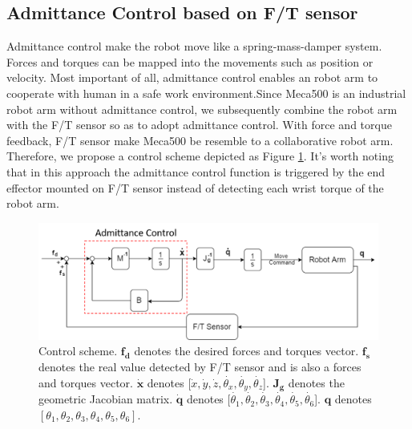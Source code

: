 \subsection{Admittance Control based on F/T sensor}
Admittance control make the robot move like a spring-mass-damper system. Forces and torques can be mapped into the movements such as position or velocity. Most important of all, admittance control enables an robot arm to cooperate with human in a safe work environment.Since Meca500 is an industrial robot arm without admittance control, we subsequently combine the robot arm with the F/T sensor so as to adopt admittance control. With force and torque feedback, F/T sensor make Meca500 be resemble to a collaborative robot arm. Therefore, we propose a control scheme depicted as Figure \ref{fig:adm ctrl}. It's worth noting that in this approach the admittance control function is triggered by the end effector mounted on F/T sensor instead of detecting each wrist torque of the robot arm.

\label{sec:adm ctrl}
\begin{figure}[htbp]
\begin{center}
\includegraphics[width=1\linewidth]{Images/adm ctrl.png}
\end{center}
\caption{
Control scheme. $\boldsymbol{f_d}$ denotes the desired forces and torques vector. $\boldsymbol{f_s}$ denotes the real value detected by F/T sensor and is also a forces and torques vector. $\boldsymbol{\dot{x}}$ denotes [$\dot{x}, \dot{y}, \dot{z}, \dot{\theta _x}, \dot{\theta _y}, \dot{\theta _z}$]. $\mathbf{J_g}$ denotes the geometric Jacobian matrix. $\boldsymbol{\dot{q}}$ denotes [$\dot{\theta _1}, \dot{\theta _2}, \dot{\theta _3}, \dot{\theta _4}, \dot{\theta _5}, \dot{\theta _6}$]. $\boldsymbol{q}$ denotes $\left[\theta _1, \theta _2, \theta _3, \theta _4, \theta _5, \theta _6 \right] $.
}\label{fig:adm ctrl}
\end{figure}

